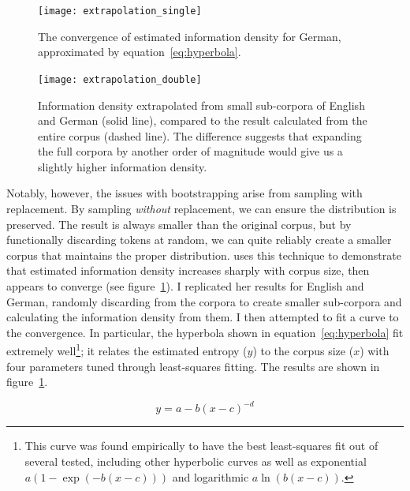 \documentclass[12pt,twoside,leqno]{article} %
\begin{document}
\begin{figure}[p]
\centering
\caption{The convergence of estimated information density for German, approximated by equation~\ref{eq:hyperbola}.}
\label{fig:exsingle}
\noindent\texttt{[image: extrapolation\_single]}
\end{figure}

\begin{figure}[p]
\centering
\caption{Information density extrapolated from small sub-corpora of English and German (solid line), compared to the result calculated from the entire corpus (dashed line). The difference suggests that expanding the full corpora by another order of magnitude would give us a slightly higher information density.}
\label{fig:exdouble}
\noindent\texttt{[image: extrapolation\_double]}
\end{figure}

Notably, however, the issues with bootstrapping arise from sampling with replacement. By sampling \emph{without} replacement, we can ensure the distribution is preserved. The result is always smaller than the original corpus, but by functionally discarding tokens at random, we can quite reliably create a smaller corpus that maintains the proper distribution. \citet[57]{oh} uses this technique to demonstrate that estimated information density increases sharply with corpus size, then appears to converge (see figure~\ref{fig:exsingle}). I replicated her results for English and German, randomly discarding from the corpora to create smaller sub-corpora and calculating the information density from them. I then attempted to fit a curve to the convergence. In particular, the hyperbola shown in equation~\ref{eq:hyperbola} fit extremely well\footnote{This curve was found empirically to have the best least-squares fit out of several tested, including other hyperbolic curves as well as exponential \(a(1-\exp(-b(x-c)))\) and logarithmic \(a\ln(b(x-c))\).}; it relates the estimated entropy (\(y\)) to the corpus size (\(x\)) with four parameters tuned through least-squares fitting. The results are shown in figure~\ref{fig:exsingle}.

\begin{equation}
\label{eq:hyperbola}
y = a-b(x-c)^{-d}
\end{equation}
\end{document}
